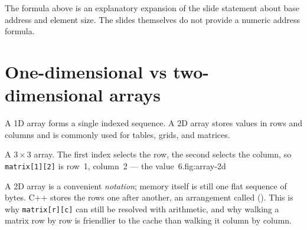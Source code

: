 \begin{clarification}
The formula above is an explanatory expansion of the slide statement about base address and element size. The slides themselves do not provide a numeric address formula.
\end{clarification}

\section{One-dimensional vs two-dimensional arrays}

A 1D array forms a single indexed sequence. A 2D array stores values in rows and columns and is commonly used for tables, grids, and matrices.

\begin{adsfig}{A $3\times3$ array. The first index selects the row, the second selects the
column, so \texttt{matrix[1][2]} is row~1, column~2 --- the value~6.}{fig:array-2d}
\end{adsfig}

\begin{clarification}
A 2D array is a convenient \emph{notation}; memory itself is still one flat sequence of
bytes. C++ stores the rows one after another, an arrangement called 
(). This is why \texttt{matrix[r][c]} can still be resolved with
arithmetic, and why walking a matrix row by row is friendlier to the cache than walking it
column by column.
\end{clarification}

